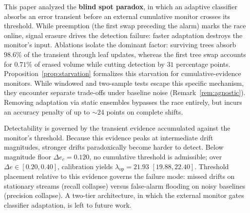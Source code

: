 \documentclass[10pt,conference]{IEEEtran}
\theoremstyle{definition}
\begin{document}
This paper analyzed the \textbf{blind spot paradox}, in which an adaptive classifier absorbs an error transient before an external cumulative monitor crosses its threshold. While preemption (the first swap preceding the alarm) marks the race online, signal erasure drives the detection failure: faster adaptation destroys the monitor's input. Ablations isolate the dominant factor: surviving trees absorb $98.6\%$ of the transient through leaf updates, whereas the first tree swap accounts for $0.71\%$ of erased volume while cutting detection by $31$ percentage points. Proposition~\ref{prop:starvation} formalizes this starvation for cumulative-evidence monitors. While windowed and two-sample tests escape this specific mechanism, they encounter separate trade-offs under baseline noise (Remark~\ref{rem:agnostic}). Removing adaptation via static ensembles bypasses the race entirely, but incurs an accuracy penalty of up to ${\sim}24$ points on complete shifts.

Detectability is governed by the transient evidence accumulated against the monitor's threshold. Because this evidence peaks at intermediate drift magnitudes, stronger drifts paradoxically become harder to detect. Below magnitude floor $\Delta e_c = 0.120$, no cumulative threshold is admissible; over $\Delta e \in [0.20, 0.40]$, calibration yields $\lambda_{\mathrm{op}} = 21.93$ $[19.88, 22.40]$. Threshold placement relative to this evidence governs the failure mode: missed drifts on stationary streams (recall collapse) versus false-alarm flooding on noisy baselines (precision collapse). A two-tier architecture, in which the external monitor gates classifier adaptation, is left to future work.



\end{document}
